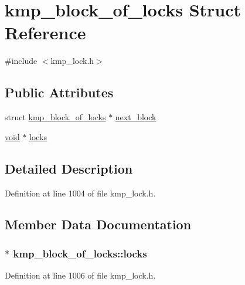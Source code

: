 \hypertarget{structkmp__block__of__locks}{\section{kmp\-\_\-block\-\_\-of\-\_\-locks Struct Reference}
\label{structkmp__block__of__locks}
}


{\ttfamily \#include $<$kmp\-\_\-lock.\-h$>$}

\subsection*{Public Attributes}
\begin{DoxyCompactItemize}
\item 
struct \hyperlink{structkmp__block__of__locks}{kmp\-\_\-block\-\_\-of\-\_\-locks} $\ast$ \hyperlink{structkmp__block__of__locks_acd79fe8422ca10aef0f7a31340f2bd5d}{next\-\_\-block}
\item 
\hyperlink{ittnotify__static_8h_af941d56e55e3c5465135b60c4d6343ed}{void} $\ast$ \hyperlink{structkmp__block__of__locks_a03913a2aa7c0f08a912fe7457b0edc1d}{locks}
\end{DoxyCompactItemize}


\subsection{Detailed Description}


Definition at line 1004 of file kmp\-\_\-lock.\-h.



\subsection{Member Data Documentation}
\hypertarget{structkmp__block__of__locks_a03913a2aa7c0f08a912fe7457b0edc1d}{
\subsubsection[{locks}]{$\ast$ kmp\-\_\-block\-\_\-of\-\_\-locks\-::locks}}\label{structkmp__block__of__locks_a03913a2aa7c0f08a912fe7457b0edc1d}


Definition at line 1006 of file kmp\-\_\-lock.\-h.



